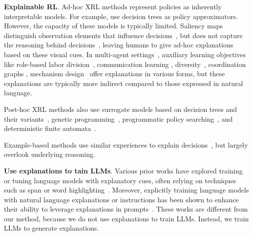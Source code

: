 \textbf{Explainable RL}. Ad-hoc XRL methods represent policies as inherently interpretable models. For example, \citet{silva2019optimization,topin2019generation,hein2018interpretable, landajuela2021discovering} use decision trees as policy approximators. However, the capacity of these models is typically limited. Saliency maps distinguish observation elements that influence decisions~\cite{atrey2019exploratory,greydanus2018visualizing,gottesman2020interpretable}, but does not capture the reasoning behind decisions~\cite{atrey2019exploratory}, leaving humans to give ad-hoc explanations based on these visual cues. In multi-agent settings~\cite{yu2022surprising,wen2022multi,kuba2021trust,wang2019influence,christianos2020shared,peng2021facmac,jiang2019graph,wen2022multi,rashid2018qmix,wang2021off,guestrin2002coordinated, guestrin2002multiagent,li2023never,song2019convergence,wang2019influence,wang2020dop,qin2024multi,wu2021containerized,zhang2024position}, auxiliary learning objectives like role-based labor division~\citep{wang2020roma, wang2021rode,dong2022low,dong2023symmetry}, communication learning \citep{singh2019learning, mao2020neighborhood,wang2019learning,zhao2024bandit}, diversity~\citep{li2021celebrating}, coordination graphs \citep{guestrin2002coordinated, guestrin2002multiagent, bohmer2020deep,kang2022non,wang2021context,yang2022self}, mechanism design~\citep{sandholm2003automated,duan2024scalable,wang2024carbon,sun2024mechanism,shen2018automated,dutting2024optimal,wang2024gemnet,hossain2024multi,wang2024deep} offer explanations in various forms, but these explanations are typically more indirect compared to those expressed in natural language.


Post-hoc XRL methods also use surrogate models based on decision trees and their variants~\cite{bastani2018verifiable,jhunjhunwala2019policy,bewley2021tripletree,liu2018toward}, genetic programming~\cite{zhang2020interpretable}, programmatic policy searching~\cite{verma2018programmatically}, and deterministic finite automata~\cite{hasanbeig2021deepsynth}.

Example-based methods use similar experiences to explain decisions~\cite{amir2018highlights,huang2018establishing,zahavy2016graying,topin2019generation}, but largely overlook underlying reasoning.

\textbf{Use explanations to tain LLMs}. Various prior works have explored training or tuning language models with explanatory cues, often relying on techniques such as span or word highlighting~\cite{hase2021can,zhou2020towards,narang2020wt5,rajani2019explain}. Moreover, explicitly training language models with natural language explanations or instructions has been shown to enhance their ability to leverage explanations in prompts~\cite{wei2021finetuned}. These works are different from our method, because we do not use explanations to train LLMs. Instead, we train LLMs to generate explanations.

